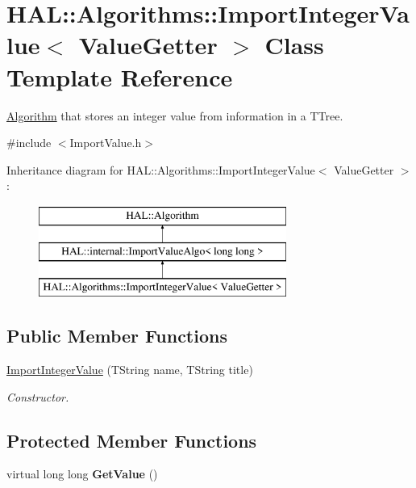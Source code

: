 \hypertarget{class_h_a_l_1_1_algorithms_1_1_import_integer_value}{\section{H\+A\+L\+:\+:Algorithms\+:\+:Import\+Integer\+Value$<$ Value\+Getter $>$ Class Template Reference}
\label{class_h_a_l_1_1_algorithms_1_1_import_integer_value}
}


\hyperlink{class_h_a_l_1_1_algorithm}{Algorithm} that stores an integer value from information in a T\+Tree.  




{\ttfamily \#include $<$Import\+Value.\+h$>$}

Inheritance diagram for H\+A\+L\+:\+:Algorithms\+:\+:Import\+Integer\+Value$<$ Value\+Getter $>$\+:\begin{figure}[H]
\begin{center}
\leavevmode
\includegraphics[height=3.000000cm]{class_h_a_l_1_1_algorithms_1_1_import_integer_value}
\end{center}
\end{figure}
\subsection*{Public Member Functions}
\begin{DoxyCompactItemize}
\item 
\hyperlink{class_h_a_l_1_1_algorithms_1_1_import_integer_value_a19a3f6712ad9a986d98c6da3a9b196ec}{Import\+Integer\+Value} (T\+String name, T\+String title)
\begin{DoxyCompactList}\small\item\em Constructor. \end{DoxyCompactList}\end{DoxyCompactItemize}
\subsection*{Protected Member Functions}
\begin{DoxyCompactItemize}
\item 
\hypertarget{class_h_a_l_1_1_algorithms_1_1_import_integer_value_a48b6c6c4e7471ce8aa79f1ed20f7d306}{virtual long long {\bfseries Get\+Value} ()}\label{class_h_a_l_1_1_algorithms_1_1_import_integer_value_a48b6c6c4e7471ce8aa79f1ed20f7d306}

\end{DoxyCompactItemize}
